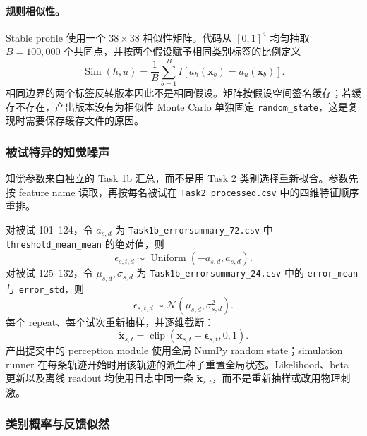 \paragraph{规则相似性。}
Stable profile 使用一个 $38\times38$ 相似性矩阵。代码从 $[0,1]^4$ 均匀抽取 $B=100{,}000$ 个共同点，并按两个假设赋予相同类别标签的比例定义
\begin{equation}
    \operatorname{Sim}(h,u)
    =\frac{1}{B}\sum_{b=1}^{B}
    I\!\left[a_h(\mathbf x_b)=a_u(\mathbf x_b)\right].
    \label{eq:modelv13-similarity}
\end{equation}
相同边界的两个标签反转版本因此不是相同假设。矩阵按假设空间签名缓存；若缓存不存在，产出版本没有为相似性 Monte Carlo 单独固定 \texttt{random\_state}，这是复现时需要保存缓存文件的原因。


\subsubsection{被试特异的知觉噪声}

知觉参数来自独立的 Task 1b 汇总，而不是用 Task 2 类别选择重新拟合。参数先按 feature name 读取，再按每名被试在 \texttt{Task2\_processed.csv} 中的四维特征顺序重排。

对被试 101--124，令 $a_{s,d}$ 为 \texttt{Task1b\_errorsummary\_72.csv} 中 \texttt{threshold\_mean\_mean} 的绝对值，则
\begin{equation}
    \epsilon_{s,t,d}\sim\operatorname{Uniform}(-a_{s,d},a_{s,d}).
    \label{eq:modelv13-uniform-noise}
\end{equation}
对被试 125--132，令 $\mu_{s,d},\sigma_{s,d}$ 为 \texttt{Task1b\_errorsummary\_24.csv} 中的 \texttt{error\_mean} 与 \texttt{error\_std}，则
\begin{equation}
    \epsilon_{s,t,d}\sim\mathcal N(\mu_{s,d},\sigma_{s,d}^2).
    \label{eq:modelv13-normal-noise}
\end{equation}
每个 repeat、每个试次重新抽样，并逐维截断：
\begin{equation}
    \widetilde{\mathbf x}_{s,t}
    =\operatorname{clip}(\mathbf x_{s,t}+\boldsymbol\epsilon_{s,t},0,1).
    \label{eq:modelv13-perceived-stimulus}
\end{equation}
产出提交中的 perception module 使用全局 NumPy random state；simulation runner 在每条轨迹开始时用该轨迹的派生种子重置全局状态。Likelihood、beta 更新以及离线 readout 均使用日志中同一条 $\widetilde{\mathbf x}_{s,t}$，而不是重新抽样或改用物理刺激。


\subsubsection{类别概率与反馈似然}

